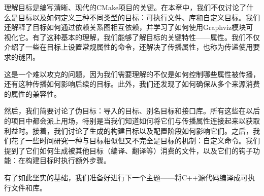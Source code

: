 理解目标是编写清晰、现代的CMake项目的关键。在本章中，我们不仅讨论了什么是目标以及如何定义三种不同类型的目标：可执行文件、库和自定义目标。我们还解释了目标如何通过依赖关系图相互依赖，并学习了如何使用Graphviz模块可视化它。有了这种基本的理解，我们能够了解目标的关键特性——属性。我们不仅介绍了一些在目标上设置常规属性的命令，还解决了传播属性，也称为传递使用要求的谜团。

这是一个难以攻克的问题，因为我们需要理解的不仅是如何控制哪些属性被传播，还有这种传播如何影响后续的目标。此外，我们还发现了如何确保从多个来源消费的属性的兼容性。

然后，我们简要讨论了伪目标：导入的目标、别名目标和接口库。所有这些在以后的项目中都会派上用场，特别是当我们知道如何将它们与传播属性连接起来以获取利益时。接着，我们讨论了生成的构建目标以及配置阶段如何影响它们。之后，我们花了一些时间研究一种与目标相似但又不完全是目标的机制：自定义命令。我们提到了它们如何生成被其他目标（编译、翻译等）消费的文件，以及它们的钩子功能：在构建目标时执行额外步骤。

有了如此坚实的基础，我们准备好进行下一个主题——将C++源代码编译成可执行文件和库。